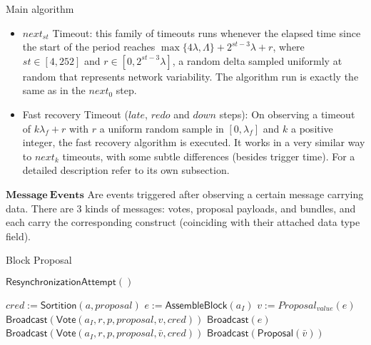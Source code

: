 \documentclass[10pt,a4paper]{article}
\begin{document}
\begin{section}{Main algorithm}
\begin{itemize}
    \item $next_{st}$ Timeout: this family of timeouts runs whenever the elapsed time since the start of the period reaches
    $\max\{4\lambda, \Lambda \} + 2^{st-3}\lambda + r$, where $st\in [4, 252]$ and $r \in [0, 2^{st-3}\lambda]$, a random 
    delta sampled uniformly at random that represents network variability.
    The algorithm run is exactly the same as in the $next_0$ step.

    \item Fast recovery Timeout ($late$, $redo$ and $down$ steps): On observing a timeout of $k\lambda_f + r$ with $r$ a uniform random sample in $[0, \lambda_f]$ and
    $k$ a positive integer, the fast recovery algorithm is executed. It works in a very similar way to $next_k$ timeouts, with some subtle differences (besides trigger time).
    For a detailed description refer to its own subsection.
\end{itemize}


$\mathbf{Message \ Events}$ Are events triggered after observing a certain message carrying data.
There are 3 kinds of messages: votes, proposal payloads, and bundles, and each carry
the corresponding construct (coinciding with their attached data type field).

\begin{subsection}{Block Proposal}\label{ssect:blockproposal}

    \begin{algorithm}
        \caption{\underline{Block Proposal}}
        \label{algo:block-proposal}
        \begin{algorithmic}[1]

            \State $\mathsf{ResynchronizationAttempt}()$

                \State $cred :=  \mathsf{Sortition}(a, proposal)$
                        \State $e := \mathsf{AssembleBlock}(a_I)$
                        \State $v := Proposal_{value}(e)$
                        \State $\mathsf{Broadcast}(\mathsf{Vote}(a_I, r, p, proposal, v, cred))$
                        \State $\mathsf{Broadcast}(e)$
                    \Else
                        \State $\mathsf{Broadcast}(\mathsf{Vote}(a_I, r, p, proposal, \bar{v}, cred))$
                            \State $\mathsf{Broadcast}(\mathsf{Proposal}(\bar{v}))$
                        \EndIf
                    \EndIf
                \EndIf
            \EndFor
        \EndFunction
        \end{algorithmic}
    \end{algorithm}


\end{subsection}
\end{section}
\end{document}
